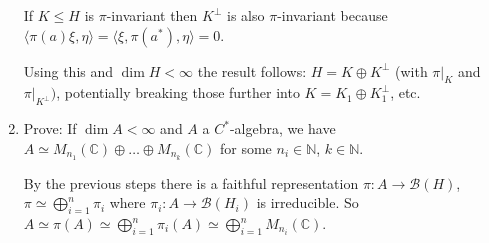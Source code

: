\documentclass[a4paper]{article}
\begin{document}
\begin{exercise}[05-03]
\begin{enumerate}[label=(\alph*)]
		If $K \leq H$ is $\pi$-invariant then $K^\bot$ is also $\pi$-invariant because $\langle \pi(a) \xi, \eta \rangle = \langle \xi, \pi(a^*), \eta \rangle = 0$.

		Using this and $\dim H < \infty$ the result follows: $H = K \oplus K^\bot$ (with $\pi|_K$ and $\pi|_{K^\bot})$, potentially breaking those further into $K = K_1 \oplus K_1^\bot$, etc.

		\item Prove: If $\dim A < \infty$ and $A$ a $C^*$-algebra, we have $A \simeq M_{n_1}(\mathds{C}) \oplus \dots \oplus M_{n_k}(\mathds{C})$ for some $n_i \in \mathds{N}$, $k \in \mathds{N}$.
		
		By the previous steps there is a faithful representation $\pi: A \to \mathcal{B}(H)$, $\pi \simeq \bigoplus_{i = 1}^n \pi_i$ where $\pi_i: A \to \mathcal{B}(H_i)$ is irreducible.
		So $A \simeq \pi(A) \simeq \bigoplus_{i = 1}^n \pi_i(A) \simeq \bigoplus_{i = 1}^n M_{n_i}(\mathds{C})$.
	\end{enumerate}
\end{exercise}
\end{document}
